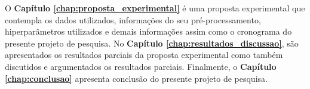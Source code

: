 O \textbf{Capítulo \ref{chap:proposta_experimental}} é uma proposta experimental que contempla os dados utilizados, informações do seu pré-processamento, hiperparâmetros utilizados e demais informações assim como o cronograma do presente projeto de pesquisa. No \textbf{Capítulo \ref{chap:resultados_discussao}}, são apresentados os resultados parciais da proposta experimental como também discutidos e argumentados os resultados parciais. Finalmente, o \textbf{Capítulo \ref{chap:conclusao}} apresenta conclusão do presente projeto de pesquisa.
